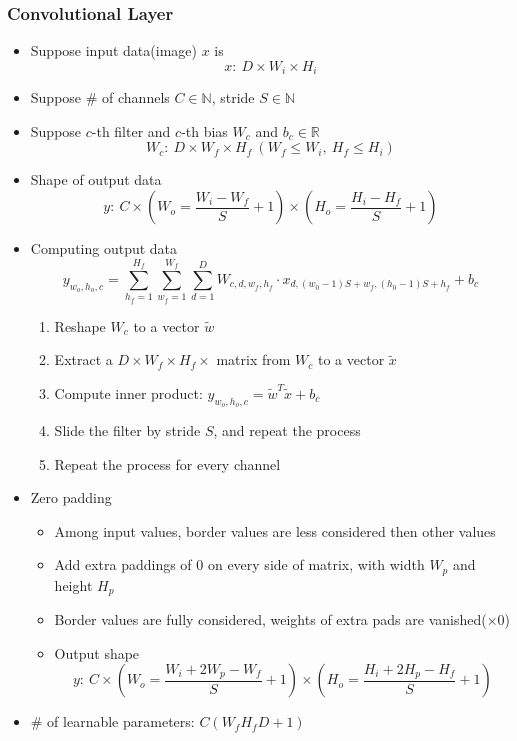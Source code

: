 \subsubsection*{Convolutional Layer}
\begin{itemize}
    \item Suppose input data(image) $x$ is
    \begin{equation}
        x:~D\times W_i\times H_i
    \end{equation}
    \item Suppose \# of channels $C\in\mathbb{N}$, stride $S\in\mathbb{N}$
    \item Suppose $c$-th filter and $c$-th bias $W_c$ and $b_c\in\mathbb{R}$
    \begin{equation}
        W_c:~D\times W_f\times H_f~(W_f\leq W_i,~H_f\leq H_i)
    \end{equation}
    \item Shape of output data
    \begin{equation}
        y:~C\times\left(W_o=\frac{W_i-W_f}{S}+1\right)\times\left(H_o=\frac{H_i-H_f}{S}+1\right)
    \end{equation}
    \item Computing output data
    \begin{equation}
        y_{w_o,h_o,c}=\sum_{h_f=1}^{H_f}\sum_{w_f=1}^{W_f}\sum_{d=1}^DW_{c,d,w_f,h_f}\cdot x_{d,(w_0-1)S+w_f,(h_0-1)S+h_f}+b_c
    \end{equation}
    \begin{enumerate}
        \item Reshape $W_c$ to a vector $\tilde{w}$
        \item Extract a $D\times W_f\times H_f\times$ matrix from $W_c$ to a vector $\tilde{x}$
        \item Compute inner product: $y_{w_o,h_o,c}=\tilde{w}^T\tilde{x}+b_c$
        \item Slide the filter by stride $S$, and repeat the process
        \item Repeat the process for every channel
    \end{enumerate}
    \item Zero padding
    \begin{itemize}
        \item Among input values, border values are less considered then other values
        \item Add extra paddings of 0 on every side of matrix, with width $W_p$ and height $H_p$
        \item Border values are fully considered, weights of extra pads are vanished($\times 0$)
        \item Output shape
        \begin{equation}
            y:~C\times\left(W_o=\frac{W_i+2W_p-W_f}{S}+1\right)\times\left(H_o=\frac{H_i+2H_p-H_f}{S}+1\right)
        \end{equation}
    \end{itemize}
    \item \# of learnable parameters: $C(W_fH_fD+1)$
\end{itemize}

